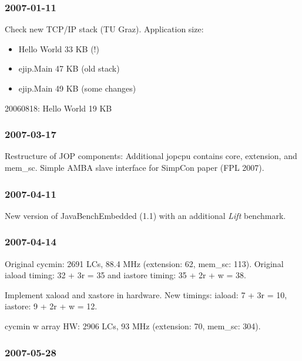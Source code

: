 \documentclass[a4paper,12pt]{scrartcl}
\newcommand{\code}[1]{{\textsf{#1}}}
\begin{document}
\subsubsection*{2007-01-11}

Check new TCP/IP stack (TU Graz). Application size:
\begin{itemize}
    \item Hello World 33 KB (!)
    \item ejip.Main 47 KB (old stack)
    \item ejip.Main 49 KB (some changes)
\end{itemize}

20060818: Hello World 19 KB


%
%

\subsubsection*{2007-03-17}

Restructure of JOP components: Additional \code{jopcpu} contains
\code{core}, \code{extension}, and \code{mem\_sc}. Simple AMBA slave
interface for SimpCon paper (FPL 2007).

\subsubsection*{2007-04-11}

New version of JavaBenchEmbedded (1.1) with an additional
\emph{Lift} benchmark.

\subsubsection*{2007-04-14}

Original cycmin: 2691 LCs, 88.4 MHz (extension: 62, mem\_sc: 113).
Original iaload timing: 32 + 3r = 35 and iastore timing: 35 + 2r + w
= 38.

Implement xaload and xastore in hardware. New timings: iaload: 7 +
3r = 10, iastore: 9 + 2r + w = 12.

cycmin w array HW: 2906 LCs, 93 MHz (extension: 70, mem\_sc: 304).

\subsubsection*{2007-05-28}
\end{document}
